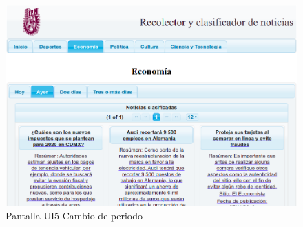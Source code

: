 \begin{figure}[H]
  \centering
  \includegraphics[scale=.4]{imagenes/Pantallas/UI5}
  \caption{Pantalla UI5 Cambio de periodo}
  \label{fig:UI5}
\end{figure}
